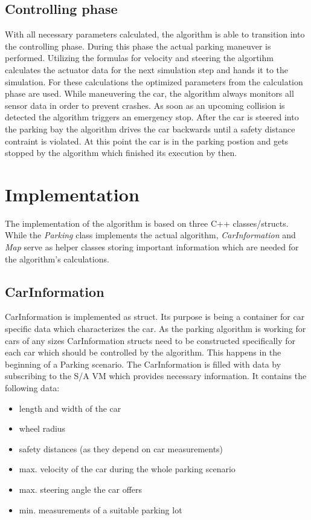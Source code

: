 \documentclass[paper=a4, fontsize=11pt]{scrreprt}
\begin{document}
\subsection{Controlling phase}
With all necessary parameters calculated, the algorithm is able to transition into the controlling phase. During this phase the actual parking maneuver is performed. Utilizing the formulas for velocity and steering the algortihm calculates the actuator data for the next simulation step and hands it to the simulation.  For these calculations the optimized parameters from the calculation phase are used. While maneuvering the car, the algorithm always monitors all sensor data in order to prevent crashes. As soon as an upcoming collision is detected the algorithm triggers an emergency stop. After the car is steered into the parking bay the algorithm drives the car backwards until a safety distance contraint is violated. At this point the car is in the parking postion and gets stopped by the algorithm which finished its execution by then.
\section{Implementation}
The implementation of the algorithm is based on three C++ classes/structs. While the \textit{Parking} class implements the actual algorithm, \textit{CarInformation} and \textit{Map} serve as helper classes storing important information which are needed for the algorithm's calculations.
\subsection{CarInformation}
CarInformation is implemented as struct. Its purpose is being a container for car specific data which characterizes the car. As the parking algorithm is working for cars of any sizes CarInformation structs need to be constructed specifically for each car which should be controlled by the algorithm. This happens in the beginning of a Parking scenario. The CarInformation is filled with data by subscribing to the S/A VM which provides necessary information. It contains the following data:
\begin{itemize}
	\item length and width of the car
	\item wheel radius
	\item safety distances (as they depend on car measurements)
	\item max. velocity of the car during the whole parking scenario
	\item max. steering angle the car offers
	\item min. measurements of a suitable parking lot
\end{itemize}
\end{document}
